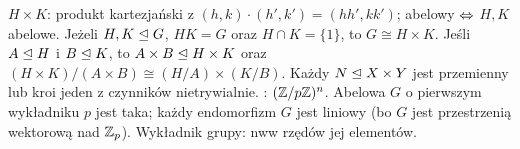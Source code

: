 
 $H \times K$: produkt  kartezjański z $(h, k) \cdot (h', k') = (hh', kk')$; abelowy $\Leftrightarrow$ $H, K$ abelowe.
Jeżeli $H, K \trianglelefteq G$, $HK = G$ oraz $H \cap K = \{1\}$, to $G \cong H \times K$.
Jeśli $A \trianglelefteq H$ i $B \trianglelefteq K$, to $A \times B \trianglelefteq H \times K$ oraz $(H \times K) / (A\times B) \cong (H / A) \times (K/B)$.
Każdy $N \trianglelefteq X \times Y$ jest przemienny lub kroi jeden z czynników nietrywialnie.
: $(\mathbb{Z}/p\mathbb{Z})^n$.
Abelowa $G$ o pierwszym wykładniku $p$ jest taka; każdy endomorfizm $G$ jest liniowy (bo $G$ jest przestrzenią wektorową nad $\mathbb{Z}_p$).
Wykładnik grupy: nww rzędów jej elementów.
